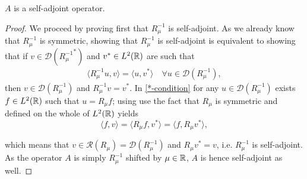 \begin{theorem} \label{2.3:thm-ASelfAdjoint}
	$A$ is a self-adjoint operator.
		
	\begin{proof}
		We proceed by proving first that $R_{\mu}^{-1}$ is self-adjoint. As we already know that $R_{\mu}^{-1}$ is symmetric, showing that $R_{\mu}^{-1}$ is self-adjoint is equivalent to showing that if $v \in \mathcal{D}({R_{\mu}^{-1}}^{*})$ and $v^{*} \in L^{2}(\mathbb{R})$ are such that
		\begin{align}
			\langle R_{\mu}^{-1} u, v \rangle = \langle u, v^{*} \rangle \quad \forall u \in \mathcal{D}(R_{\mu}^{-1}), \label{*-condition}
		\end{align}
		then $v \in \mathcal{D}(R_{\mu}^{-1})$ and $R_{\mu}^{-1} v = v^{*}$.
		In \eqref{*-condition} for any $u \in \mathcal{D}(R_{\mu}^{-1})$ exists $f \in L^{2}(\mathbb{R})$ such that $u = R_{\mu} f$; using use the fact that $R_{\mu}$ is symmetric and defined on the whole of $L^{2}(\mathbb{R})$ yields
		\[  \langle f, v \rangle = \langle R_{\mu} f, v^{*} \rangle = \langle f, R_{\mu} v^{*} \rangle, \]
		
		which means that $v \in \mathcal{R}(R_{\mu}) = \mathcal{D}(R_{\mu}^{-1})$ and $R_{\mu} v^{*} = v$, i.e. $R_{\mu}^{-1}$ is self-adjoint. As the operator $A$ is simply $R_{\mu}^{-1}$ shifted by $\mu \in \mathbb{R}$, $A$ is hence self-adjoint as well.		
	\end{proof}
\end{theorem}

